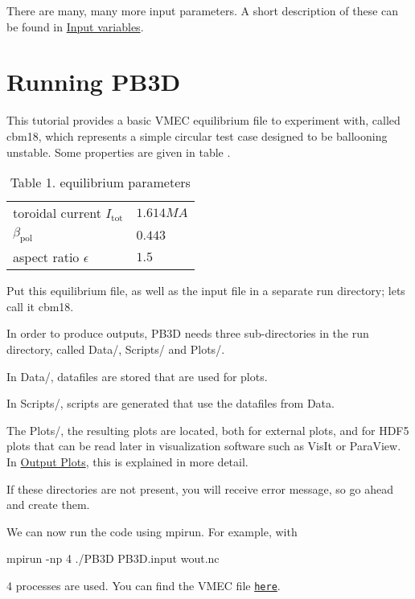 There are many, many more input parameters. A short description of these can be found in \hyperlink{page_inputs}{Input variables}.\hypertarget{page_tutorial_tutorial_PB3D}{}\section{Running P\+B3D}\label{page_tutorial_tutorial_PB3D}
This tutorial provides a basic V\+M\+EC equilibrium file to experiment with, called {\ttfamily cbm18}, which represents a simple circular test case designed to be ballooning unstable. \cite{ferraro2010ELMbenchmark} Some properties are given in table . \hypertarget{page_tutorial_tutorial_PB3D_tab}{}
\tabulinesep=1mm
\begin{longtabu} spread 0pt [c]{*{2}{|X[-1]}|}
\caption{Table 1. equilibrium parameters}\label{page_tutorial_tutorial_PB3D_tab}\\
\hline
toroidal current $I_\text{tot}$  &$1.614MA$   \\
$\beta_\text{pol}$  &$0.443 $   \\
aspect ratio $\epsilon$  &$1.5 $   \\
\end{longtabu}


Put this equilibrium file, as well as the input file in a separate run directory; let\textquotesingle{}s call it {\ttfamily cbm18}.

In order to produce outputs, P\+B3D needs three sub-\/directories in the run directory, called {\ttfamily Data/}, {\ttfamily Scripts/} and {\ttfamily Plots/}.
\begin{DoxyItemize}
\item In {\ttfamily Data/}, datafiles are stored that are used for plots.
\item In {\ttfamily Scripts/}, scripts are generated that use the datafiles from {\ttfamily Data}.
\item The {\ttfamily Plots/}, the resulting plots are located, both for external plots, and for H\+D\+F5 plots that can be read later in visualization software such as Vis\+It or Para\+View. In \hyperlink{page_outputs_output_plots}{Output Plots}, this is explained in more detail.
\end{DoxyItemize}

If these directories are not present, you will receive error message, so go ahead and create them.

We can now run the code using {\ttfamily mpirun}. For example, with 
\begin{DoxyCode}
mpirun -np 4 ./PB3D PB3D.input wout.nc 
\end{DoxyCode}
 4 processes are used. You can find the V\+M\+EC file \href{Examples/wout.nc}{\tt here}.

